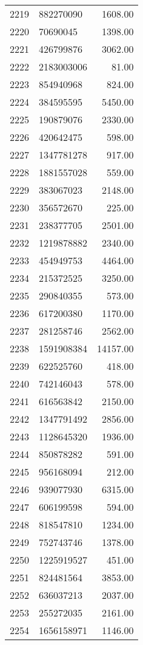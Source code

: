 \begin{table}[ht]
\begin{tabular}{rlr}
  2219 & 882270090 & 1608.00 \\ 
  2220 & 70690045 & 1398.00 \\ 
  2221 & 426799876 & 3062.00 \\ 
  2222 & 2183003006 & 81.00 \\ 
  2223 & 854940968 & 824.00 \\ 
  2224 & 384595595 & 5450.00 \\ 
  2225 & 190879076 & 2330.00 \\ 
  2226 & 420642475 & 598.00 \\ 
  2227 & 1347781278 & 917.00 \\ 
  2228 & 1881557028 & 559.00 \\ 
  2229 & 383067023 & 2148.00 \\ 
  2230 & 356572670 & 225.00 \\ 
  2231 & 238377705 & 2501.00 \\ 
  2232 & 1219878882 & 2340.00 \\ 
  2233 & 454949753 & 4464.00 \\ 
  2234 & 215372525 & 3250.00 \\ 
  2235 & 290840355 & 573.00 \\ 
  2236 & 617200380 & 1170.00 \\ 
  2237 & 281258746 & 2562.00 \\ 
  2238 & 1591908384 & 14157.00 \\ 
  2239 & 622525760 & 418.00 \\ 
  2240 & 742146043 & 578.00 \\ 
  2241 & 616563842 & 2150.00 \\ 
  2242 & 1347791492 & 2856.00 \\ 
  2243 & 1128645320 & 1936.00 \\ 
  2244 & 850878282 & 591.00 \\ 
  2245 & 956168094 & 212.00 \\ 
  2246 & 939077930 & 6315.00 \\ 
  2247 & 606199598 & 594.00 \\ 
  2248 & 818547810 & 1234.00 \\ 
  2249 & 752743746 & 1378.00 \\ 
  2250 & 1225919527 & 451.00 \\ 
  2251 & 824481564 & 3853.00 \\ 
  2252 & 636037213 & 2037.00 \\ 
  2253 & 255272035 & 2161.00 \\ 
  2254 & 1656158971 & 1146.00 \\ 

\end{tabular}
\end{table}
